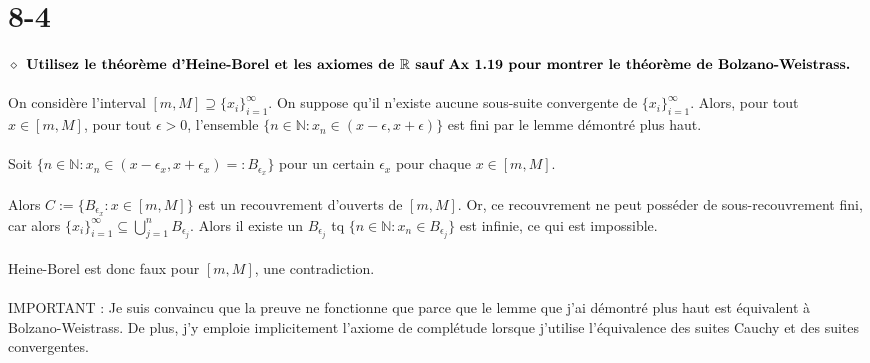 \documentclass[a4paper,10pt]{article}
\begin{document}
\section*{8-4}
 
$\diamond$ $\textbf{Utilisez le théorème d'Heine-Borel et les axiomes de } \mathbb{R} \\ \textbf{ sauf Ax 1.19 pour montrer le théorème de Bolzano-Weistrass.}$
\\
\\
On considère l'interval $[m, M] \supseteq \{x_i\}_{i=1}^\infty$. On suppose qu'il n'existe aucune sous-suite convergente
de $\{x_i\}_{i=1}^\infty$. Alors, pour tout $x \in [m, M]$, pour tout $\epsilon > 0$, l'ensemble $\{n \in \mathbb{N} : x_n \in (x-\epsilon, x+\epsilon)\}$
est fini par le lemme démontré plus haut.
\\
\\
Soit $\{n \in \mathbb{N} : x_n \in (x-\epsilon_x, x+\epsilon_x) =: B_{\epsilon_x}\}$ pour un certain $\epsilon_x$ pour chaque $x \in [m, M]$. 
\\
\\
Alors $C := \{B_{\epsilon_x} : x \in [m, M]\}$ est un recouvrement d'ouverts de $[m, M]$. Or, ce recouvrement ne peut posséder de 
sous-recouvrement fini, car alors $\{x_i\}_{i=1}^\infty \subseteq \bigcup_{j=1}^n B_{\epsilon_j}$. Alors il existe un $B_{\epsilon_j}$ tq 
$\{n \in \mathbb{N} : x_n \in B_{\epsilon_j}\}$ est infinie, ce qui est impossible.
\\
\\
Heine-Borel est donc faux pour $[m,M]$, une contradiction.
\\
\\
IMPORTANT : Je suis convaincu que la preuve ne fonctionne que parce que le lemme que j'ai démontré plus haut est équivalent à 
Bolzano-Weistrass. De plus, j'y emploie implicitement l'axiome de complétude lorsque j'utilise l'équivalence des suites Cauchy et 
des suites convergentes.
\end{document}
